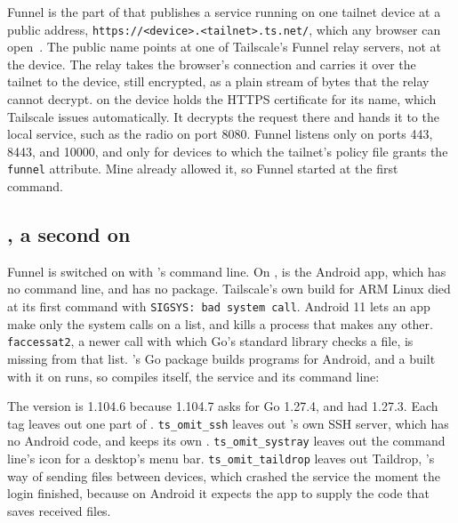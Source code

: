 \documentclass[11pt,a4paper]{article}
\begin{document}
Funnel is the part of  that publishes a service running on one tailnet device at a public address, \texttt{https://<device>.<tailnet>.ts.net/}, which any browser can open~\cite{funnel}. The public name points at one of Tailscale's Funnel relay servers, not at the device. The relay takes the browser's connection and carries it over the tailnet to the device, still encrypted, as a plain stream of bytes that the relay cannot decrypt.  on the device holds the HTTPS certificate for its name, which Tailscale issues automatically. It decrypts the request there and hands it to the local service, such as the radio on port 8080. Funnel listens only on ports 443, 8443, and 10000, and only for devices to which the tailnet's policy file grants the \texttt{funnel} attribute. Mine already allowed it, so Funnel started at the first command.

\subsection*{, a second  on }

Funnel is switched on with 's command line. On ,  is the Android app, which has no command line, and  has no  package. Tailscale's own build for ARM Linux died at its first command with \texttt{SIGSYS: bad system call}. Android 11 lets an app make only the system calls on a list, and kills a process that makes any other. \texttt{faccessat2}, a newer call with which Go's standard library checks a file, is missing from that list. 's Go package builds programs for Android, and a  built with it on  runs, so  compiles  itself, the service and its command line:


The version is 1.104.6 because 1.104.7 asks for Go 1.27.4, and  had 1.27.3. Each tag leaves out one part of . \texttt{ts\_omit\_ssh} leaves out 's own SSH server, which has no Android code, and  keeps its own . \texttt{ts\_omit\_systray} leaves out the command line's icon for a desktop's menu bar. \texttt{ts\_omit\_taildrop} leaves out Taildrop, 's way of sending files between devices, which crashed the service the moment the login finished, because on Android it expects the app to supply the code that saves received files.
\end{document}
